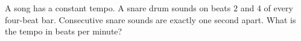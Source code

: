 A song has a constant tempo. A snare drum sounds on beats $2$ and $4$ of every four-beat bar. Consecutive snare sounds are exactly one second apart. What is the tempo in beats per minute?

